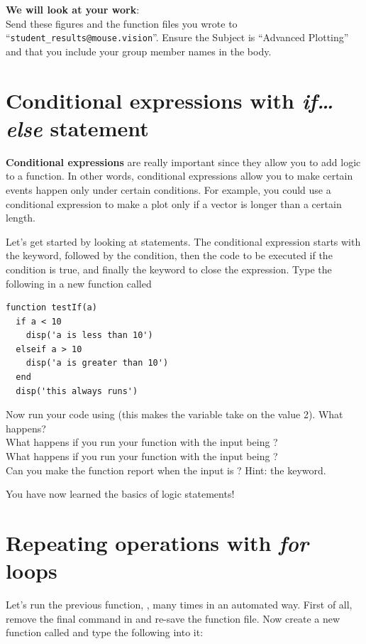 \documentclass{article}
\begin{document}
\textbf{We will look at your work}: \\
Send these figures and the function files you wrote to ``\verb|student_results@mouse.vision|''.
Ensure the Subject is ``Advanced Plotting'' and that you include your group member names in the body.

\pagebreak

\section{Conditional expressions with \emph{if\dots else} statement}

\textbf{Conditional expressions} are really important since they allow you to add logic to a function.
In other words, conditional expressions allow you to make certain events happen only under certain conditions.
For example, you could use a conditional expression to make a plot only if a vector is longer than a certain length.

Let's get started by looking at  statements.
The conditional expression starts with the  keyword, followed by the condition, then the code to be executed if the condition is true, and finally the  keyword to close the expression.
Type the following in a new function called 
\begin{lstlisting}
function testIf(a)
  if a < 10
    disp('a is less than 10')
  elseif a > 10
  	disp('a is greater than 10')
  end
  disp('this always runs')
\end{lstlisting}

Now run your code using  (this makes the variable  take on the value 2).
What happens? \\
What happens if you run your function with the input being ?\\
What happens if you run your function with the input being ?\\
Can you make the function report when the input is ? Hint: the  keyword.

You have now learned the basics of logic statements!

\pagebreak


\section{Repeating operations with \emph{for} loops}

Let's run the previous function, , many times in an automated way.
First of all, remove the final  command in  and re-save the function file.
Now create a new function called  and type the following into it:
\end{document}
